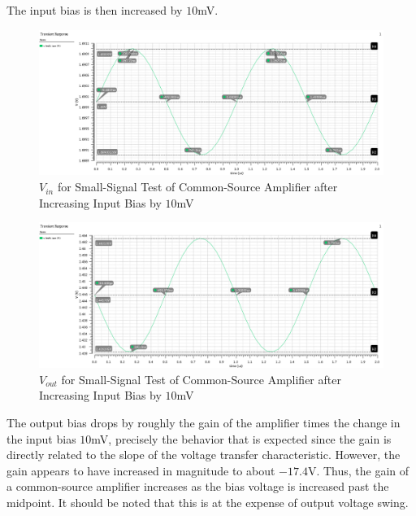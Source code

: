 
The input bias is then increased by $10$\si{\milli\volt}.

\FloatBarrier

\begin{figure}[h!]
	\centering
	\includegraphics[scale=0.45]{./images/sim2_vin_plus10mV.PNG}
	\caption{$V_{in}$ for Small-Signal Test of Common-Source Amplifier after Increasing Input Bias by $10$\si{\milli\volt}}
	\label{fig:sim2_vin_plus10mV}
\end{figure}

\FloatBarrier

\FloatBarrier

\begin{figure}[h!]
	\centering
	\includegraphics[scale=0.45]{./images/sim2_vout_plus10mV.PNG}
	\caption{$V_{out}$ for Small-Signal Test of Common-Source Amplifier after Increasing Input Bias by $10$\si{\milli\volt}}
	\label{fig:sim2_vout_plus10mV}
\end{figure}

\FloatBarrier

The output bias drops by roughly the gain of the amplifier times the change in the input bias $10$\si{\milli\volt}, precisely the behavior that is expected since the gain is directly related to the slope of the voltage transfer characteristic.
However, the gain appears to have increased in magnitude to about $-17.4$\si{\volt}.
Thus, the gain of a common-source amplifier increases as the bias voltage is increased past the midpoint.
It should be noted that this is at the expense of output voltage swing.

